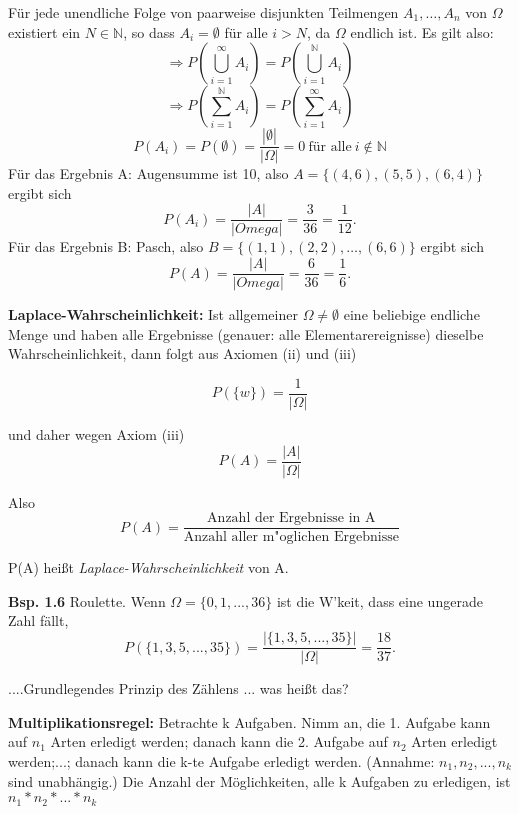 \documentclass[a4paper,11pt]{article}
\begin{document}
\vspace{2pt}
\noindent Für jede unendliche Folge von paarweise disjunkten Teilmengen $A_1,\dots,A_n$ von $\Omega$ existiert ein $N\in\mathbb{N}$, so dass $A_i=\emptyset$ für alle $i>N$, da $\Omega$ endlich ist.
Es gilt also:
\[\Rightarrow P(\bigcup_{i=1}^{\infty}A_i)=P(\bigcup_{i=1}^{\mathbb{N}}A_i)\]
\[\Rightarrow P(\sum_{i=1}^{\mathbb{N}}A_i)=P(\sum_{i=1}^{\infty}A_i)\]
\[P(A_i)=P(\emptyset)=\frac{|\emptyset|}{|\Omega|}=0\ \text{für alle}\ i\notin\mathbb{N}\]
\newline Für das Ergebnis A: \glqq Augensumme ist 10\grqq, also $A=\{(4,6),(5,5),(6,4)\}$ ergibt sich \[P(A_i)=\frac{|A|}{|Omega|}=\frac{3}{36}=\frac{1}{12}.\]
\newline Für das Ergebnis B: \glqq Pasch\grqq, also $B=\{(1,1),(2,2),\dots,(6,6)\}$ ergibt sich 
\[P(A)=\frac{|A|}{|Omega|}=\frac{6}{36}=\frac{1}{6}.\]


\vspace{6pt}
\noindent\textbf{Laplace-Wahrscheinlichkeit:} Ist allgemeiner $\Omega \neq \emptyset$ eine beliebige endliche Menge und haben alle Ergebnisse 
(genauer: alle Elementarereignisse) dieselbe Wahrscheinlichkeit, dann folgt aus Axiomen (ii) und (iii)

\[ P(\{w\})=\frac{1}{|\Omega|} \]

\noindent und daher wegen Axiom (iii) \[ P(A)=\frac{|A|}{|\Omega|} \]

\noindent Also \[ P(A)=\frac{\text{Anzahl der Ergebnisse in A}}{\text{Anzahl aller m"oglichen Ergebnisse}} \] 

\noindent P(A) heißt \textit{Laplace-Wahrscheinlichkeit} von A.

\vspace{6pt}
\noindent\textbf{Bsp. 1.6} Roulette.
Wenn $\Omega = \{0,1,...,36\} $ ist die W'keit, dass eine ungerade Zahl fällt, \[P(\{1,3,5,...,35\})=\frac{|\{1,3,5,...,35\}|}{|\Omega|} = \frac{18}{37}.\]

\noindent....Grundlegendes Prinzip des Zählens ... was heißt das?

\vspace{6pt}
\noindent\textbf{Multiplikationsregel:} Betrachte k Aufgaben. Nimm an, die 
1. Aufgabe kann auf $n_1$ Arten erledigt werden; danach kann die 
2. Aufgabe auf $n_2$ Arten erledigt werden;...; danach kann die 
k-te Aufgabe erledigt werden. (Annahme: $n_1,n_2,...,n_k$ sind unabhängig.) 
\newline Die Anzahl der Möglichkeiten, alle k Aufgaben zu erledigen, ist $n_1*n_2*...*n_k$
\end{document}
